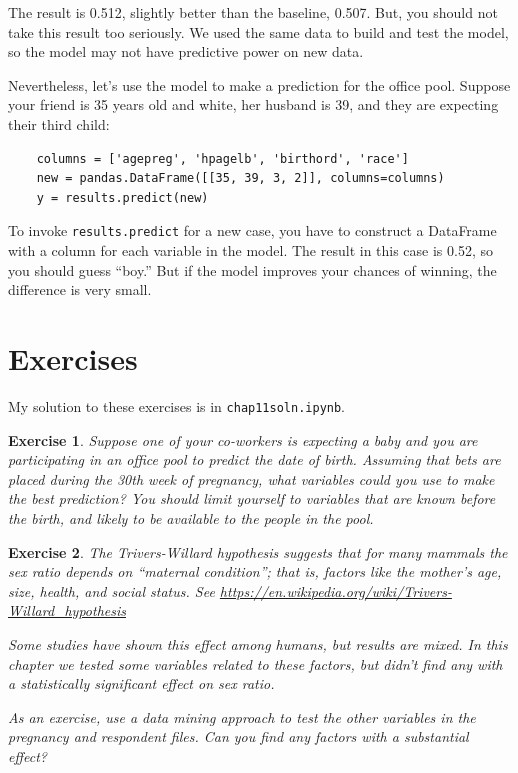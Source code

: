 \documentclass[12pt]{book}
\theoremstyle{exercise}
\newtheorem{exercise}{Exercise}[chapter]
\begin{document}
The result is 0.512, slightly better than the
baseline, 0.507.  But, you should not take this result too seriously.
We used the same data to build and test the model, so the model
may not have predictive power on new data.%

Nevertheless, let's use the model to make a prediction for the office
pool.  Suppose your friend is 35 years old and white,
her husband is 39, and they are expecting their third child:

\begin{verbatim}
    columns = ['agepreg', 'hpagelb', 'birthord', 'race']
    new = pandas.DataFrame([[35, 39, 3, 2]], columns=columns)
    y = results.predict(new)
\end{verbatim}

To invoke {\tt results.predict} for a new case, you have to construct
a DataFrame with a column for each variable in the model.  The result
in this case is 0.52, so you should guess ``boy.''  But if the model
improves your chances of winning, the difference is very small.%



\section{Exercises}

My solution to these exercises is in \verb"chap11soln.ipynb".

\begin{exercise}
Suppose one of your co-workers is expecting a baby and you are
participating in an office pool to predict the date of birth.
Assuming that bets are placed during the 30th week of pregnancy, what
variables could you use to make the best prediction?  You should limit
yourself to variables that are known before the birth, and likely to
be available to the people in the pool.%
%

\end{exercise}


\begin{exercise}
The Trivers-Willard hypothesis suggests that for many mammals the
sex ratio depends on ``maternal condition''; that is,
factors like the mother's age, size, health, and social status.
See \url{https://en.wikipedia.org/wiki/Trivers-Willard_hypothesis}%
%

Some studies have shown this effect among humans, but results are
mixed.  In this chapter we tested some variables related to these
factors, but didn't find any with a statistically significant effect
on sex ratio.%
%

As an exercise, use a data mining approach to test the other variables
in the pregnancy and respondent files.  Can you find any factors with
a substantial effect?%

\end{exercise}
\end{document}
